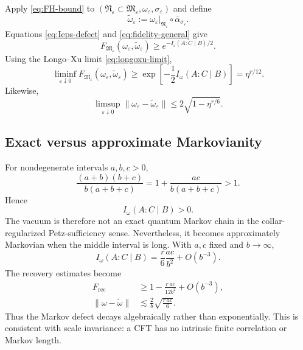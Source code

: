 \documentclass[11pt]{article}
\theoremstyle{accenttheorem}
\theoremstyle{definition}
\newcommand{\cM}{\mathfrak{M}}
\newcommand{\cN}{\mathfrak{N}}
\newcommand{\CMI}{I}
\newcommand{\eps}{\varepsilon}
\newcommand{\1}{\mathbf{1}}
\begin{document}
Apply \eqref{eq:FH-bound} to
\((\cN_\eps\subset\cM_\eps,\omega_\eps,\sigma_\eps)\) and define
\begin{equation}\label{eq:recovered-vacuum}
 \widetilde\omega_\eps
 :=\omega_\eps|_{\cN_\eps}
   \circ\overline\alpha_{\sigma_\eps}.
\end{equation}
Equations \eqref{eq:Ieps-defect} and \eqref{eq:fidelity-general} give
\begin{equation}\label{eq:eps-recovery-bound}
 F_{\cM_\eps}(\omega_\eps,\widetilde\omega_\eps)
 \ge e^{-\CMI_\eps(A:C\mid B)/2}.
\end{equation}
Using the Longo--Xu limit \eqref{eq:longoxu-limit},
\begin{equation}\label{eq:cross-ratio-fidelity}
 \liminf_{\eps\downarrow0}
 F_{\cM_\eps}(\omega_\eps,\widetilde\omega_\eps)
 \ge
 \exp\!\left[-\frac12\CMI_\omega(A:C\mid B)\right]
 =\eta^{r/12}.
\end{equation}
Likewise,
\begin{equation}\label{eq:cross-ratio-norm}
 \limsup_{\eps\downarrow0}
 \|\omega_\eps-\widetilde\omega_\eps\|
 \le2\sqrt{1-\eta^{r/6}}.
\end{equation}

\subsection{Exact versus approximate Markovianity}

For nondegenerate intervals \(a,b,c>0\),
\[
 \frac{(a+b)(b+c)}{b(a+b+c)}
 =1+\frac{ac}{b(a+b+c)}>1.
\]
Hence
\begin{equation}\label{eq:strict-positive}
 \CMI_\omega(A:C\mid B)>0.
\end{equation}
The vacuum is therefore not an exact quantum Markov chain in the collar-regularized Petz-sufficiency sense.  Nevertheless, it becomes approximately Markovian when the middle interval is long.  With \(a,c\) fixed and \(b\to\infty\),
\begin{equation}\label{eq:large-b-cmi}
 \CMI_\omega(A:C\mid B)
 =\frac r6\frac{ac}{b^2}+O(b^{-3}).
\end{equation}
The recovery estimates become
\begin{align}
 F_{\mathrm{rec}}
 &\ge1-\frac{r\,ac}{12b^2}+O(b^{-3}),
 \label{eq:large-b-fidelity}\\
 \|\omega-\widetilde\omega\|
 &\lesssim\frac{2}{b}\sqrt{\frac{r\,ac}{6}}.
 \label{eq:large-b-norm}
\end{align}
Thus the Markov defect decays algebraically rather than exponentially.  This is consistent with scale invariance: a CFT has no intrinsic finite correlation or Markov length.
\end{document}
